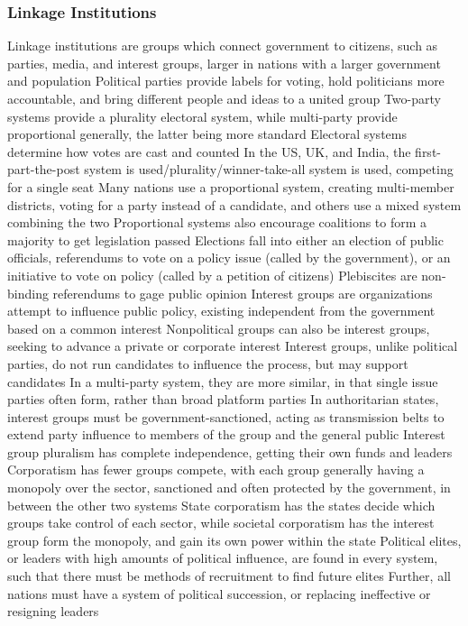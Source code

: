 \documentclass[11 pt, twoside]{article}
\newenvironment{outline*}
{
	\begin{outline}[enumerate]
	}
	{\end{outline}
}
\begin{document}
\subsubsection{Linkage Institutions}
\begin{outline*}
\1 Linkage institutions are groups which connect government to citizens, such as parties, media, and interest groups, larger in nations with a larger government and population
\1 Political parties provide labels for voting, hold politicians more accountable, and bring different people and ideas to a united group
\2 Two-party systems provide a plurality electoral system, while multi-party provide proportional generally, the latter being more standard
\1 Electoral systems determine how votes are cast and counted
\2 In the US, UK, and India, the first-part-the-post system is used/plurality/winner-take-all system is used, competing for a single seat
\2 Many nations use a proportional system, creating multi-member districts, voting for a party instead of a candidate, and others use a mixed system combining the two
\3 Proportional systems also encourage coalitions to form a majority to get legislation passed
\2 Elections fall into either an election of public officials, referendums to vote on a policy issue (called by the government), or an initiative to vote on policy (called by a petition of citizens)
\3 Plebiscites are non-binding referendums to gage public opinion
\1 Interest groups are organizations attempt to influence public policy, existing independent from the government based on a common interest
\2 Nonpolitical groups can also be interest groups, seeking to advance a private or corporate interest
\2 Interest groups, unlike political parties, do not run candidates to influence the process, but may support candidates
\2 In a multi-party system, they are more similar, in that single issue parties often form, rather than broad platform parties
\2 In authoritarian states, interest groups must be government-sanctioned, acting as transmission belts to extend party influence to members of the group and the general public
\2 Interest group pluralism has complete independence, getting their own funds and leaders
\2 Corporatism has fewer groups compete, with each group generally having a monopoly over the sector, sanctioned and often protected by the government, in between the other two systems
\3 State corporatism has the states decide which groups take control of each sector, while societal corporatism has the interest group form the monopoly, and gain its own power within the state
\1 Political elites, or leaders with high amounts of political influence, are found in every system, such that there must be methods of recruitment to find future elites
\2 Further, all nations must have a system of political succession, or replacing ineffective or resigning leaders
\end{outline*}
\end{document}

